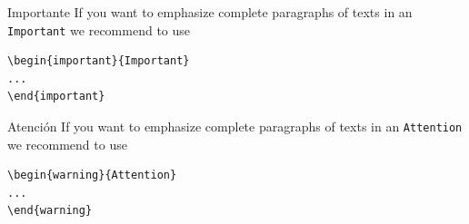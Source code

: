 \begin{important}{Importante}
If you want to emphasize complete paragraphs of texts in an \verb|Important| we recommend to
use  \begin{verbatim}\begin{important}{Important}
...
\end{important}\end{verbatim}
\end{important}
%
\clearpage
\begin{warning}{Atención}
If you want to emphasize complete paragraphs of texts in an \verb|Attention| we recommend to
use  \begin{verbatim}\begin{warning}{Attention}
...
\end{warning}\end{verbatim}
\end{warning}

